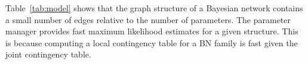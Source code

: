 Table~\ref{tab:model} shows that the graph structure of a Bayesian network contains a small number of edges relative to the number of parameters. 
The parameter manager provides fast maximum likelihood estimates for a given structure. 
This is because computing a local contingency table for a BN family is fast given the joint contingency table.
%

\begin{table}[htbp]
\caption{Model Manager Evaluation.}
  \centering
  \label{tab:model}%
\end{table}%


